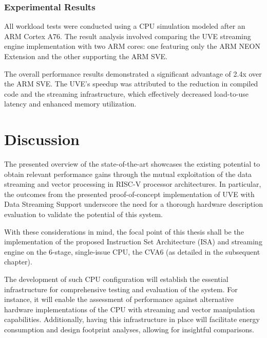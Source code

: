 \subsubsection{Experimental Results}

All workload tests were conducted using a CPU simulation modeled after an ARM Cortex A76. The result analysis involved comparing the UVE streaming engine implementation with two ARM cores: one featuring only the ARM NEON Extension and the other supporting the ARM SVE.

The overall performance results demonstrated a significant advantage of 2.4x over the ARM SVE. The UVE's speedup was attributed to the reduction in compiled code and the streaming infrastructure, which effectively decreased load-to-use latency and enhanced memory utilization.

\section{Discussion}
The presented overview of the state-of-the-art showcases the existing potential to obtain relevant performance gains through the mutual exploitation of the data streaming and vector processing in RISC-V processor architectures. In particular, the outcomes from the presented proof-of-concept implementation of UVE with Data Streaming Support underscore the need for a thorough hardware description evaluation to validate the potential of this system.

With these considerations in mind, the focal point of this thesis shall be the implementation of the proposed Instruction Set Architecture (ISA) and streaming engine on the 6-stage, single-issue CPU, the CVA6 (as detailed in the subsequent chapter).

The development of such CPU configuration will establish the essential infrastructure for comprehensive testing and evaluation of the system. For instance, it will enable the assessment of performance against alternative hardware implementations of the CPU with streaming and vector manipulation capabilities. Additionally, having this infrastructure in place will facilitate energy consumption and design footprint analyses, allowing for insightful comparisons.






